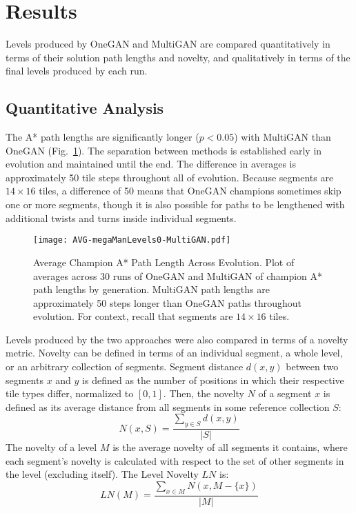 \section{Results}

Levels produced by OneGAN and MultiGAN are compared quantitatively in terms of their solution path lengths and novelty, and qualitatively in terms of the final levels produced by each run. 

\subsection{Quantitative Analysis}
The A* path lengths are significantly longer ($p < 0.05$) with MultiGAN than OneGAN (Fig.~\ref{fig:averageScores}). The separation between methods is established early in evolution and maintained until the end. The difference in averages is approximately 50 tile steps throughout all of evolution. Because segments are $14 \times 16$ tiles, a difference of 50 means that OneGAN champions sometimes skip one or more segments, though it is also possible for paths to be lengthened with additional twists and turns inside individual segments.


\begin{figure}[t]
\centering
\texttt{[image: AVG-megaManLevels0-MultiGAN.pdf]}
\caption{Average Champion A* Path Length Across Evolution. \normalfont Plot of averages across 30 runs of OneGAN and MultiGAN of champion A* path lengths by generation. MultiGAN path lengths are approximately 50 steps longer than OneGAN paths throughout evolution. For context, recall that segments are $14 \times 16$ tiles.}
\label{fig:averageScores}
\end{figure}



Levels produced by the two approaches were also compared in terms of a novelty metric. Novelty can be defined in terms of an individual segment, a whole level, or an arbitrary collection of segments. Segment distance $d(x,y)$ between two segments $x$ and $y$ is defined as the number of positions in which their respective tile types differ, normalized to $[0,1]$. Then, the novelty $N$ of a segment $x$ is defined as its average distance from all segments in some reference collection $S$:
\begin{equation}
    N(x,S) = \frac{\sum_{y \in S} d(x,y)}{|S|}
\end{equation}
The novelty of a level $M$ is the average novelty of all segments it contains, where each segment's novelty is calculated with respect to the set of other segments in the level (excluding itself). The Level Novelty $LN$ is:
\begin{equation}
    LN(M) = \frac{\sum_{x \in M} N(x, M - \{x\})}{|M|}
\end{equation}

